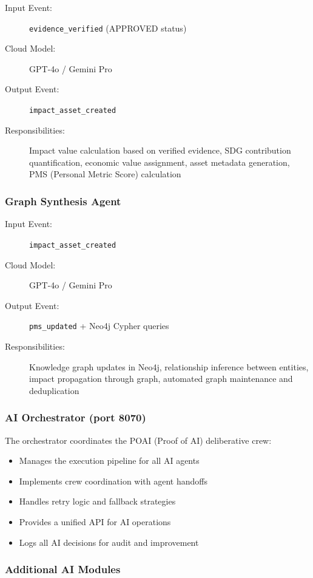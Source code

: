 \begin{description}
  \item[Input Event:] \texttt{evidence\_verified} (APPROVED status)
  \item[Cloud Model:] GPT-4o / Gemini Pro
  \item[Output Event:] \texttt{impact\_asset\_created}
  \item[Responsibilities:] Impact value calculation based on verified evidence, SDG contribution quantification, economic value assignment, asset metadata generation, PMS (Personal Metric Score) calculation
\end{description}

\subsubsection{Graph Synthesis Agent}

\begin{description}
  \item[Input Event:] \texttt{impact\_asset\_created}
  \item[Cloud Model:] GPT-4o / Gemini Pro
  \item[Output Event:] \texttt{pms\_updated} + Neo4j Cypher queries
  \item[Responsibilities:] Knowledge graph updates in Neo4j, relationship inference between entities, impact propagation through graph, automated graph maintenance and deduplication
\end{description}

\subsubsection{AI Orchestrator (port 8070)}

The orchestrator coordinates the POAI (Proof of AI) deliberative crew:
\begin{itemize}
  \item Manages the execution pipeline for all AI agents
  \item Implements crew coordination with agent handoffs
  \item Handles retry logic and fallback strategies
  \item Provides a unified API for AI operations
  \item Logs all AI decisions for audit and improvement
\end{itemize}

\subsubsection{Additional AI Modules}

